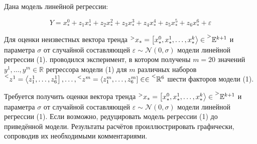 \begin{singlespace}
\vspace{3em}

\parbox{\textwidth}{
}

\vspace{3em}

\parbox{\textwidth}{
}

\vspace{7em}

\parbox{\textwidth}{
}

\end{singlespace}

\newpage

\doublespacing

\section*{}

Дана модель линейной регрессии:

\begin{equation}
	Y = x^0_* + z_1x^1_* + z_2x^2_* + z_3x^3_* + z_4x^4_* + z_5x^5_* + z_6x^6_* + \varepsilon
\end{equation}

Для оценки неизвестных вектора тренда 
$\prescript{>}{}{x_*} = \left[ x^0_*, x^1_*, \dots, x^k_* \right> \in \prescript{>}{}{\mathbb{E}^{k+1}}$
и параметра $\sigma$ от случайной составляющей $\varepsilon \sim \mathcal{N}(0, \sigma)$ модели линейной регрессии (1). 
проводился эксперимент, в котором получены $m = 20$ значений $y^1, \dots, y^m \in \mathbb{R}$
регрессора модели (1) для $m$ различных наборов 
$\prescript{<}{}{z^1} = \left< z^1_1, \dots,  z^1_6\right], \dots, \prescript{<}{}{z^m} = \left< z^m_1, \dots,  z^m_6\right] 
\in \in \prescript{<}{}{\mathbb{R}^{6}}$ шести факторов модели (1).

Требуется получить оценки вектора тренда
$\prescript{>}{}{x_*} = \left[ x^0_*, x^1_*, \dots, x^k_* \right> \in \prescript{>}{}{\mathbb{E}^{k+1}}$
и параметра $\sigma$ от случайной составляющей $\varepsilon \sim \mathcal{N}(0, \sigma)$ модели линейной регрессии (1). 
Если возможно, редуцировать модель регрессии (1) до приведённой модели. 
Результаты расчётов проиллюстрировать графически, сопроводив их необходимыми комментариями.

\vspace{-0.75\baselineskip}

\section*{}

